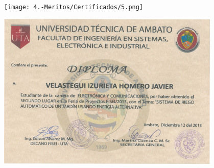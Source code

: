 \begin{figure}[ht]
    \setlength{\parindent}{-10pt}
    \texttt{[image: 4.-Meritos/Certificados/5.png]}
\end{figure}

\begin{figure}[ht]
    \setlength{\parindent}{-10pt}
    \includegraphics[width=0.95\textwidth]{4.-Meritos/Certificados/4.png}
\end{figure}

